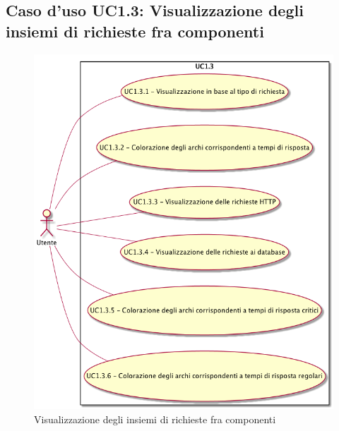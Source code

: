 \subsection{Caso d'uso UC1.3: Visualizzazione degli insiemi di richieste fra componenti}
\begin{figure} [H]
	\centering
	\includegraphics[scale=0.45]{./UC/UC1-3.png}
	\caption{Visualizzazione degli insiemi di richieste fra componenti}\label{}
\end{figure}
